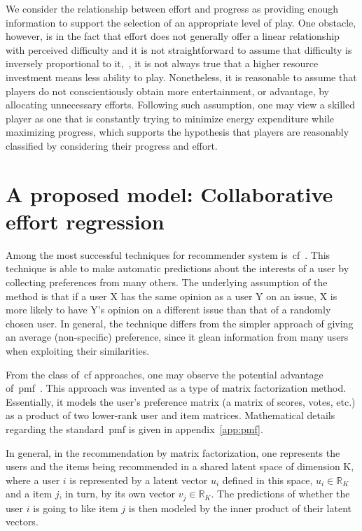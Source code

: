 We consider the relationship between effort and progress as providing enough information to support the selection of an appropriate level of play. One obstacle, however, is in the fact that effort does not generally offer a linear relationship with perceived difficulty and it is not straightforward to assume that difficulty is inversely proportional to it,~\ie, it is not always true that a higher resource investment means less ability to play. 
Nonetheless, it is reasonable to assume that players do not conscientiously obtain more entertainment, or advantage, by allocating unnecessary efforts. Following such assumption, one may view a skilled player as one that is constantly trying to minimize energy expenditure while maximizing progress, which supports the hypothesis that players are reasonably classified by considering their progress and effort.

\section{A proposed model: Collaborative effort regression}

Among the most successful techniques for recommender system is~\gls{cf}~\citep{su_survey_2009, schafer_collaborative_2007}. %
This technique is able to make automatic predictions about the interests of a user by collecting preferences from many others. The underlying assumption of the method is that if a user X has the same opinion as a user Y on an issue, X is more likely to have Y's opinion on a different issue than that of a randomly chosen user. In general, the technique differs from the simpler approach of giving an average (non-specific) preference, since it glean information from many users when exploiting their similarities.

From the class of~\gls{cf} approaches, one may observe the potential advantage of~\gls{pmf}~\citep{mnih_probabilistic_2008}. This approach was invented as a type of matrix factorization method. Essentially, it models the user's preference matrix (a matrix of scores, votes, etc.) as a product of two lower-rank user and item matrices. Mathematical details regarding the standard~\gls{pmf} is given in appendix~\ref{app:pmf}. 

In general, in the recommendation by matrix factorization, one represents the users and the items being recommended in a shared latent space of dimension K, where a user $i$ is represented by a latent vector $u_{i}$ defined in this space, \ie $u_{i} \in \mathbb{R}_{K}$ and a item $j$, in turn, by its own vector $v_{j} \in \mathbb{R}_{K}$. The predictions of whether the user $i$ is going to like item $j$ is then modeled by the inner product of their latent vectors.

